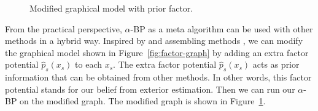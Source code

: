 \begin{figure}[!t]
  \begin{centering}
    \caption{Modified graphical model with prior factor.}\label{fig:factor-graph-with-prior}
  \end{centering}
\end{figure}


From the practical perspective, $\alpha$-BP as a meta algorithm can be used with other methods in a hybrid way. Inspired by \cite{pseudo_priorBP2010} and assembling methods \cite{James:2014:ISL:2517747}, we can modify the graphical model shown in Figure~\ref{fig:factor-graph} by adding an extra factor potential $\hat{p}_s(x_s)$ to each $x_s$. The extra factor potential $\hat{p}_s(x_s)$ acts as prior information that can be obtained from other methods. In other words, this factor potential stands for our belief from exterior estimation. Then we can run our $\alpha$-BP on the modified graph. The modified graph is shown in Figure~\ref{fig:factor-graph-with-prior}.





